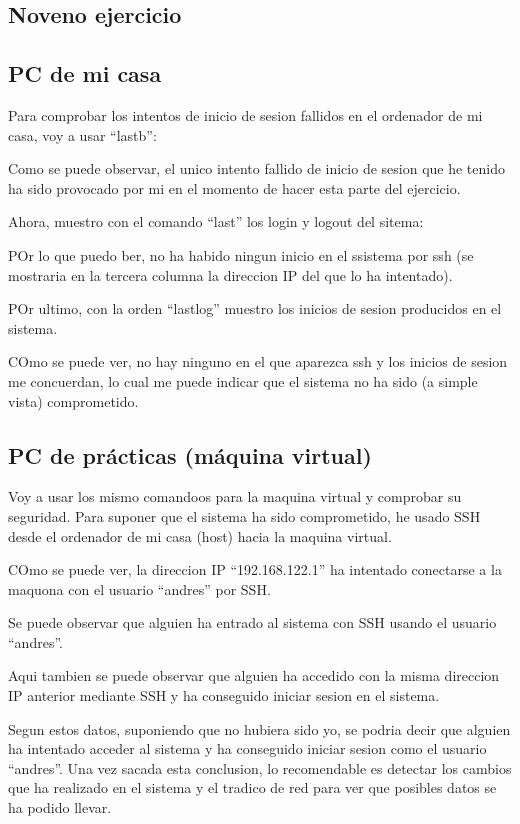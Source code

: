 \documentclass{article}
\begin{document}

\subsection{Noveno ejercicio}
\subsection{PC de mi casa}
Para comprobar los intentos de inicio de sesion fallidos en el ordenador de mi casa, voy a usar ``lastb'':

Como se puede observar, el unico intento fallido de inicio de sesion que he tenido ha sido provocado por mi en el momento de hacer esta parte del ejercicio.

Ahora, muestro con el comando ``last'' los login y logout del sitema:


POr lo que puedo ber, no ha habido ningun inicio en el ssistema por ssh (se mostraria en la tercera columna la direccion IP del que lo ha intentado).

POr ultimo, con la orden ``lastlog'' muestro los inicios de sesion producidos en el sistema.


COmo se puede ver, no hay ninguno en el que aparezca ssh y los inicios de sesion me concuerdan, lo cual me puede indicar que el sistema no ha sido (a simple vista) comprometido.
\subsection{PC de prácticas (máquina virtual)}
Voy a usar los mismo comandoos para la maquina virtual y comprobar su seguridad. Para suponer que el sistema ha sido comprometido, he usado SSH desde el ordenador de mi casa (host) hacia la maquina virtual.

COmo se puede ver, la direccion IP ``192.168.122.1'' ha intentado conectarse a la maquona con el usuario ``andres'' por SSH. 

Se puede observar que alguien ha entrado al sistema con SSH usando el usuario ``andres''.

Aqui tambien se puede observar que alguien ha accedido con la misma direccion IP anterior mediante SSH y ha conseguido iniciar sesion en el sistema.

Segun estos datos, suponiendo que no hubiera sido yo, se podria decir que alguien ha intentado acceder al sistema y ha conseguido iniciar sesion como el usuario ``andres''. Una vez sacada esta conclusion, lo recomendable es detectar los cambios que ha realizado en el sistema y el tradico de red para ver que posibles datos se ha podido llevar.
\end{document}
